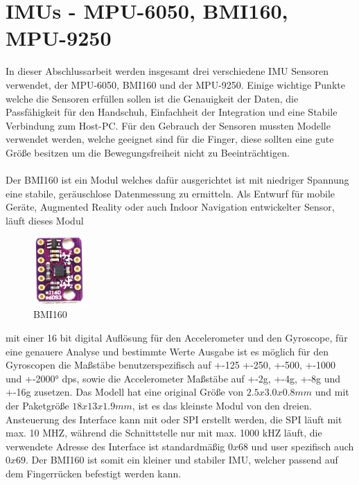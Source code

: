 \section{IMUs - MPU-6050, BMI160, MPU-9250}
In dieser Abschlussarbeit werden insgesamt drei verschiedene IMU Sensoren verwendet, der MPU-6050, BMI160 und der MPU-9250. Einige wichtige Punkte welche die Sensoren erfüllen sollen ist die Genauigkeit der Daten, die Passfähigkeit für den Handschuh, Einfachheit der Integration und eine Stabile Verbindung zum Host-PC. Für den Gebrauch der Sensoren mussten Modelle verwendet werden, welche geeignet sind für die Finger, diese sollten eine gute Größe besitzen um die Bewegungsfreiheit nicht zu Beeinträchtigen.
\\
\\
Der BMI160 ist ein Modul welches dafür ausgerichtet ist mit niedriger Spannung eine stabile, geräuschlose Datenmessung zu ermitteln. Als Entwurf für mobile Geräte, Augmented Reality oder auch Indoor Navigation entwickelter Sensor, läuft dieses Modul 
\begin{figure}
  \begin{center}
    \includegraphics[width=0.18\textwidth]{Bachelorarbeit/images/BMI160.png}
  \end{center}
  \caption{BMI160}
\end{figure}
mit einer 16 bit digital Auflösung für den Accelerometer und den Gyroscope, für eine genauere Analyse und bestimmte Werte Ausgabe ist es möglich für den Gyroscopen die Maßstäbe benutzerspezifisch auf +-125 +-250, +-500, +-1000 und +-2000° dps, sowie die Accelerometer Maßstäbe auf +-2g, +-4g, +-8g und +-16g zusetzen. Das Modell hat eine original Größe von $2.5 x 3.0 x 0.8mm$ und mit der Paketgröße $18 x 13 x 1.9mm$, ist es das kleinste Modul von den dreien. Ansteuerung des Interface kann mit \iic oder SPI erstellt werden, die SPI läuft mit max. 10 MHZ, während die \iic Schnittstelle nur mit max. 1000 kHZ läuft, die verwendete Adresse des \iic Interface ist standardmäßig $0x68$ und user spezifisch auch $0x69$. Der BMI160 ist somit ein kleiner und stabiler IMU, welcher passend auf dem Fingerrücken befestigt werden kann. 
\\
